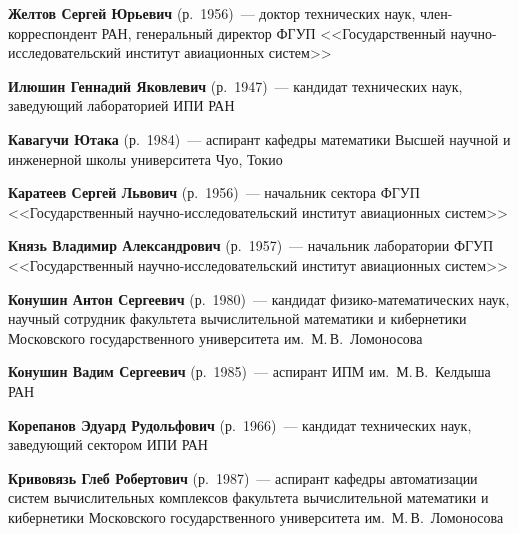 \begin{multicols}{2}

\noindent
\textbf{Желтов Сергей Юрьевич} (р.\ 1956)~--- доктор технических наук, член-корреспондент РАН,
генеральный директор ФГУП <<Государственный научно-ис\-сле\-до\-ва\-тельский институт авиационных систем>>


\noindent
\textbf{Илюшин Геннадий Яковлевич} (р.\ 1947)~--- кандидат технических наук,
за\-ве\-ду\-ющий лабораторией ИПИ РАН 


\noindent
\textbf{Кавагучи Ютака} (р.\ 1984)~--- аспирант кафедры математики Высшей научной и инженерной школы университета Чуо, 
Токио


\noindent
\textbf{Каратеев Сергей Львович} (р.\ 1956)~--- начальник сектора
ФГУП <<Государственный научно-ис\-сле\-до\-вательский институт авиационных систем>>


\noindent
\textbf{Князь Владимир Александрович} (р.\ 1957)~--- начальник лаборатории
ФГУП <<Государственный научно-ис\-сле\-до\-ва\-тельский институт авиационных систем>>


\noindent
\textbf{Конушин Антон Сергеевич} (р.\ 1980)~--- кандидат фи\-зи\-ко-математических наук, 
научный сотрудник факультета вычислительной математики и кибернетики Московского
государственного университета им.\ М.\,В.~Ломоносова


\noindent
\textbf{Конушин Вадим Сергеевич} (р.\ 1985)~--- аспирант ИПМ им.\ М.\,В.~Келдыша РАН


\noindent
\textbf{Корепанов Эдуард Рудольфович} (р.\ 1966)~--- кандидат технических наук,  заведующий сектором ИПИ РАН



\noindent
\textbf{Кривовязь Глеб Робертович} (р.\ 1987)~--- аспирант кафедры автоматизации систем 
вычислительных ком\-плек\-сов факультета вычислительной математики и кибернетики Московского
государственного университета им.\ М.\,В.~Ломоносова


\end{multicols}
